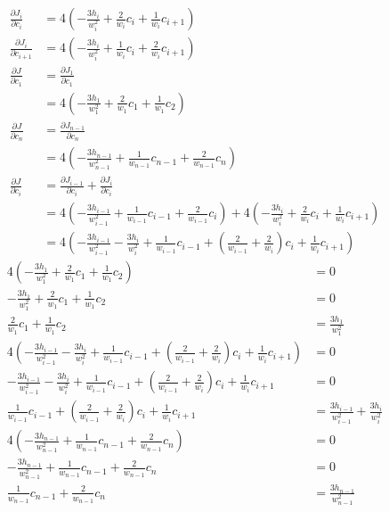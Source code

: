 \documentclass{article}
\begin{document}
\begin{align*}
  \frac{\partial J_i}{\partial c_i}
  &= 4\left(-\frac{3h_i}{w_i^2}+\frac{2}{w_i}c_i+\frac{1}{w_i}c_{i+1}\right) \\
  \frac{\partial J_i}{\partial c_{i+1}}
  &= 4\left(-\frac{3h_i}{w_i^2}+\frac{1}{w_i}c_i+\frac{2}{w_i}c_{i+1}\right) \\
  \frac{\partial J}{\partial c_1}
  &= \frac{\partial J_1}{\partial c_1} \\
  &= 4\left(-\frac{3h_1}{w_1^2}+\frac{2}{w_1}c_1+\frac{1}{w_1}c_2\right) \\
  \frac{\partial J}{\partial c_n}
  &= \frac{\partial J_{n-1}}{\partial c_n} \\
  &= 4\left(-\frac{3h_{n-1}}{w_{n-1}^2}+\frac{1}{w_{n-1}}c_{n-1}+\frac{2}{w_{n-1}}c_n\right) \\
  \frac{\partial J}{\partial c_i}
  &= \frac{\partial J_{i-1}}{\partial c_i}
  + \frac{\partial J_i}{\partial c_i} \\
  &= 4\left(-\frac{3h_{i-1}}{w_{i-1}^2}+\frac{1}{w_{i-1}}c_{i-1}+\frac{2}{w_{i-1}}c_i\right)
  + 4\left(-\frac{3h_i}{w_i^2}+\frac{2}{w_i}c_i+\frac{1}{w_i}c_{i+1}\right) \\
  &= 4\left(-\frac{3h_{i-1}}{w_{i-1}^2}-\frac{3h_i}{w_i^2}
  +\frac{1}{w_{i-1}}c_{i-1}
  +\left(\frac{2}{w_{i-1}}+\frac{2}{w_i}\right)c_i
  +\frac{1}{w_i}c_{i+1}\right)
\end{align*}
\begin{align*}
  4\left(-\frac{3h_1}{w_1^2}+\frac{2}{w_1}c_1+\frac{1}{w_1}c_2\right)
  &= 0 \\
  -\frac{3h_1}{w_1^2}+\frac{2}{w_1}c_1+\frac{1}{w_1}c_2
  &= 0 \\
  \frac{2}{w_1}c_1+\frac{1}{w_1}c_2
  &= \frac{3h_1}{w_1^2} \\
  4\left(-\frac{3h_{i-1}}{w_{i-1}^2}-\frac{3h_i}{w_i^2}
  +\frac{1}{w_{i-1}}c_{i-1}
  +\left(\frac{2}{w_{i-1}}+\frac{2}{w_i}\right)c_i
  +\frac{1}{w_i}c_{i+1}\right)
  &= 0 \\
  -\frac{3h_{i-1}}{w_{i-1}^2}-\frac{3h_i}{w_i^2}
  +\frac{1}{w_{i-1}}c_{i-1}
  +\left(\frac{2}{w_{i-1}}+\frac{2}{w_i}\right)c_i
  +\frac{1}{w_i}c_{i+1}
  &= 0 \\
  \frac{1}{w_{i-1}}c_{i-1}
  +\left(\frac{2}{w_{i-1}}+\frac{2}{w_i}\right)c_i
  +\frac{1}{w_i}c_{i+1}
  &= \frac{3h_{i-1}}{w_{i-1}^2}+\frac{3h_i}{w_i^2} \\
  4\left(-\frac{3h_{n-1}}{w_{n-1}^2}+\frac{1}{w_{n-1}}c_{n-1}+\frac{2}{w_{n-1}}c_n\right)
  &= 0 \\
  -\frac{3h_{n-1}}{w_{n-1}^2}+\frac{1}{w_{n-1}}c_{n-1}+\frac{2}{w_{n-1}}c_n
  &= 0 \\
  \frac{1}{w_{n-1}}c_{n-1}+\frac{2}{w_{n-1}}c_n
  &= \frac{3h_{n-1}}{w_{n-1}^2}
\end{align*}
\end{document}
